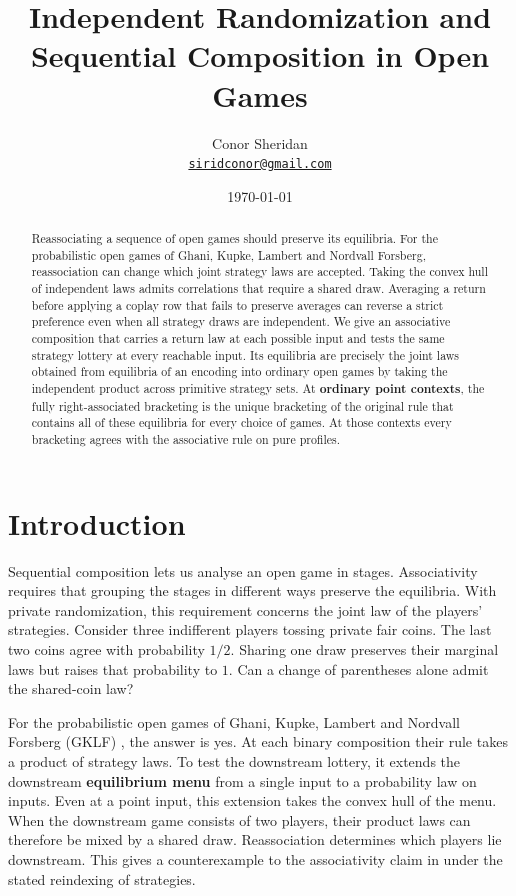 \documentclass[11pt,a4paper]{article}
\author{%
    Conor Sheridan\\
    \small\href{mailto:siridconor@gmail.com}{\texttt{siridconor@gmail.com}}%
}
\date{\today}
\title{Independent Randomization and Sequential Composition in Open Games}
\theoremstyle{definition}
\begin{document}
\maketitle

\begin{abstract}
    Reassociating a sequence of open games should preserve its equilibria. For the probabilistic open games of Ghani, Kupke, Lambert and Nordvall Forsberg, reassociation can change which joint strategy laws are accepted. Taking the convex hull of independent laws admits correlations that require a shared draw. Averaging a return before applying a coplay row that fails to preserve averages can reverse a strict preference even when all strategy draws are independent. We give an associative composition that carries a return law at each possible input and tests the same strategy lottery at every reachable input. Its equilibria are precisely the joint laws obtained from equilibria of an encoding into ordinary open games by taking the independent product across primitive strategy sets. At \textbf{ordinary point contexts}, the fully right-associated bracketing is the unique bracketing of the original rule that contains all of these equilibria for every choice of games. At those contexts every bracketing agrees with the associative rule on pure profiles.
\end{abstract}

\section{Introduction}

Sequential composition lets us analyse an open game in stages. Associativity requires that grouping the stages in different ways preserve the equilibria. With private randomization, this requirement concerns the joint law of the players' strategies. Consider three indifferent players tossing private fair coins. The last two coins agree with probability $1/2$. Sharing one draw preserves their marginal laws but raises that probability to $1$. Can a change of parentheses alone admit the shared-coin law?

For the probabilistic open games of Ghani, Kupke, Lambert and Nordvall Forsberg (GKLF) \cite{gklf}, the answer is yes. At each binary composition their rule takes a product of strategy laws. To test the downstream lottery, it extends the downstream \textbf{equilibrium menu} from a single input to a probability law on inputs. Even at a point input, this extension takes the convex hull of the menu. When the downstream game consists of two players, their product laws can therefore be mixed by a shared draw. Reassociation determines which players lie downstream. This gives a counterexample to the associativity claim in \cite[Theorem~15]{gklf} under the stated reindexing of strategies.
\end{document}
